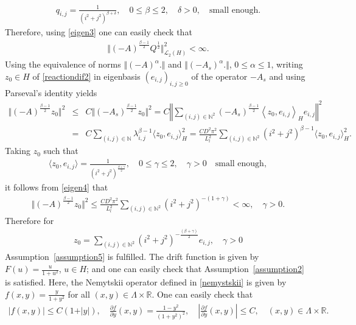 \documentclass[review,12pt]{elsarticle}
\newcommand{\assref}[1]{{Assumption~\ref{#1}}}
\begin{document}
\begin{eqnarray}
\label{eigen2}
q_{i,j}=\frac{1}{(i^2+j^2)^{\beta+\delta}},\quad 0\leq \beta\leq 2, \quad \delta>0,\quad \text{small enough}.
\end{eqnarray}
Therefore, using \eqref{eigen3} one can easily check that
\begin{eqnarray}
\Vert (-A)^{\frac{\beta-1}{2}}Q^{\frac{1}{2}}\Vert^2_{\mathcal{L}_2(H)}<\infty.
\end{eqnarray}
Using the equivalence of norms $\Vert (-A)^{\alpha}.\Vert$ and $\Vert (-A_s)^{\alpha}.\Vert$, $0\leq \alpha\leq 1$, writing $z_0\in H$ of \eqref{reactiondif2} in eigenbasis $(e_{i,j})_{i, j\geq 0}$ of the operator $-A_s$ and using Parseval's identity yields
\begin{eqnarray}
\label{eigen4}
\Vert (-A)^{\frac{\beta-1}{2}}z_0\Vert^2&\leq& C\Vert (-A_s)^{\frac{\beta-1}{2}}z_0\Vert^2=C\left\Vert\sum_{(i,j)\in\mathbb{N}^2}(-A_s)^{\frac{\beta-1}{2}}\left\langle z_0, e_{i,j}\right\rangle_H e_{i,j}\right\Vert^2\nonumber\\
&=&C\sum_{(i,j)\in\mathbb{N}}\lambda_{i,j}^{\beta-1}\langle z_0, e_{i,j}\rangle_H^2=\frac{CD^2\pi^2}{L_l^2}\sum_{(i,j)\in\mathbb{N}^2}(i^2+j^2)^{\beta-1}\langle z_0, e_{i,j}\rangle_H^2.
\end{eqnarray}
Taking $z_0$ such that 
\begin{eqnarray}
\label{eigen5}
\langle z_0, e_{i,j}\rangle=\frac{1}{(i^2+j^2)^{\frac{\beta+\gamma}{2}}},\quad 0\leq\gamma\leq 2,\quad \gamma>0\quad \text{small enough},
\end{eqnarray}
it follows from \eqref{eigen4} that
\begin{eqnarray}
\label{eigen6}
\Vert (-A)^{\frac{\beta-1}{2}}z_0\Vert^2\leq \frac{CD^2\pi^2}{L_l^2}\sum_{(i,j)\in\mathbb{N}^2}(i^2+j^2)^{-(1+\gamma)}<\infty,\quad \gamma>0.
\end{eqnarray}
Therefore for
\begin{eqnarray}
z_0=\sum_{(i,j)\in\mathbb{N}^2}(i^2+j^2)^{-\frac{(\beta+\gamma)}{2}}e_{i,j},\quad \gamma>0
\end{eqnarray}
 \assref{assumption5} is fulfilled. 
 The drift function is given by $F(u)=\frac{u}{1+u^2}$, $u\in H$; and one can easily check that \assref{assumption2}  is  satisfied. Here, the Nemytskii operator defined in \eqref{nemystskii} is given by $f(x,y)=\frac{y}{1+y^2}$ for all $(x, y)\in\Lambda\times\mathbb{R}$.  One can easily check that
 \begin{eqnarray}
 \label{borne1}
 \vert f(x,y)\vert\leq C(1+\vert y\vert),\quad \frac{\partial f}{\partial y}(x,y)=\frac{1-y^2}{(1+y^2)^2},\quad \left\vert\frac{\partial f}{\partial y}(x,y)\right\vert\leq C,\quad (x,y)\in\Lambda\times\mathbb{R}.
 \end{eqnarray}
\end{document}
